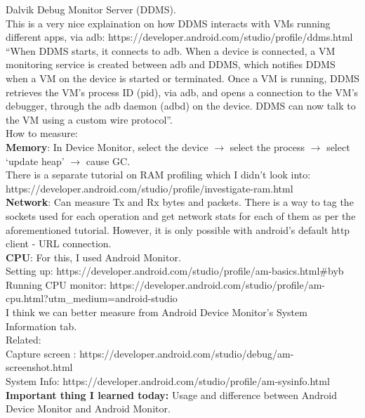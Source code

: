 \documentclass[11pt]{article}
\begin{document}
Dalvik Debug Monitor Server (DDMS). \\

This is a very nice explaination on how DDMS interacts with VMs running different apps, via adb: 
https://developer.android.com/studio/profile/ddms.html\\
``When DDMS starts, it connects to adb. When a device is connected, a VM monitoring service is created between adb and DDMS, which notifies DDMS when 
a VM on the device is started or terminated. Once a VM is running, DDMS retrieves the VM's process ID (pid), via adb, and opens a connection to the 
VM's debugger, through the adb daemon (adbd) on the device. DDMS can now talk to the VM using a custom wire protocol''.\\

How to measure:\\
\textbf{Memory}: In Device Monitor, select the device $\longrightarrow$ select the process $\longrightarrow$ select `update heap' 
$\longrightarrow$ cause GC.\\
There is a separate tutorial on RAM profiling which I didn't look into: https://developer.android.com/studio/profile/investigate-ram.html\\

\textbf{Network}: Can measure Tx and Rx bytes and packets. There is a way to tag the sockets used for each operation and get network stats for each 
of them as per the aforementioned tutorial. However, it is only possible with android's default http client - URL connection.\\

\textbf{CPU}: For this, I used Android Monitor. \\
Setting up: https://developer.android.com/studio/profile/am-basics.html\#byb\\
Running CPU monitor: https://developer.android.com/studio/profile/am-cpu.html?utm\_medium=android-studio\\

I think we can better measure from Android Device Monitor's System Information tab.\\

Related: \\
Capture screen : https://developer.android.com/studio/debug/am-screenshot.html\\
System Info: https://developer.android.com/studio/profile/am-sysinfo.html\\

\textbf{Important thing I learned today:} Usage and difference between Android Device Monitor and Android Monitor.\\
\end{document}
